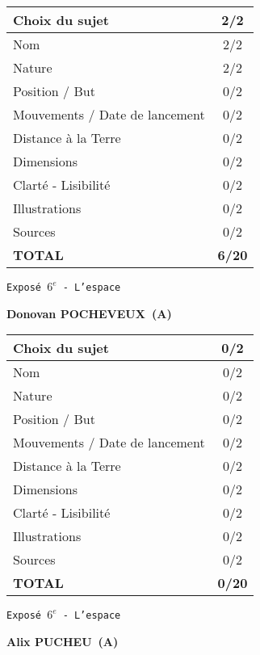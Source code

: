 	\vspace*{2cm}
	\begin{tabular}{|l|c|}
		\hline
		Choix du sujet & 2/2 \\
		\hline
		Nom & 2/2 \\
		\hline
		Nature & 2/2 \\
		\hline
		Position / But & 0/2 \\
		\hline
		Mouvements / Date de lancement & 0/2 \\
		\hline
		Distance \`a la Terre & 0/2 \\
		\hline
		Dimensions & 0/2 \\
		\hline
		Clart\'e - Lisibilit\'e & 0/2 \\
		\hline
		Illustrations & 0/2 \\
		\hline
		Sources & 0/2 \\
		\hline
		\textbf{TOTAL}  & \textbf{6/20} \\
		\hline
	\end{tabular}
	\newline
	\LARGE{\texttt{Expos\'e $6^e$ - L'espace}}
	\vspace*{1cm}

	\textbf{Donovan POCHEVEUX\ (A)}

	\vspace*{2cm}
	\begin{tabular}{|l|c|}
		\hline
		Choix du sujet & 0/2 \\
		\hline
		Nom & 0/2 \\
		\hline
		Nature & 0/2 \\
		\hline
		Position / But & 0/2 \\
		\hline
		Mouvements / Date de lancement & 0/2 \\
		\hline
		Distance \`a la Terre & 0/2 \\
		\hline
		Dimensions & 0/2 \\
		\hline
		Clart\'e - Lisibilit\'e & 0/2 \\
		\hline
		Illustrations & 0/2 \\
		\hline
		Sources & 0/2 \\
		\hline
		\textbf{TOTAL}  & \textbf{0/20} \\
		\hline
	\end{tabular}
	\newline
	\LARGE{\texttt{Expos\'e $6^e$ - L'espace}}
	\vspace*{1cm}

	\textbf{Alix PUCHEU\ (A)}


